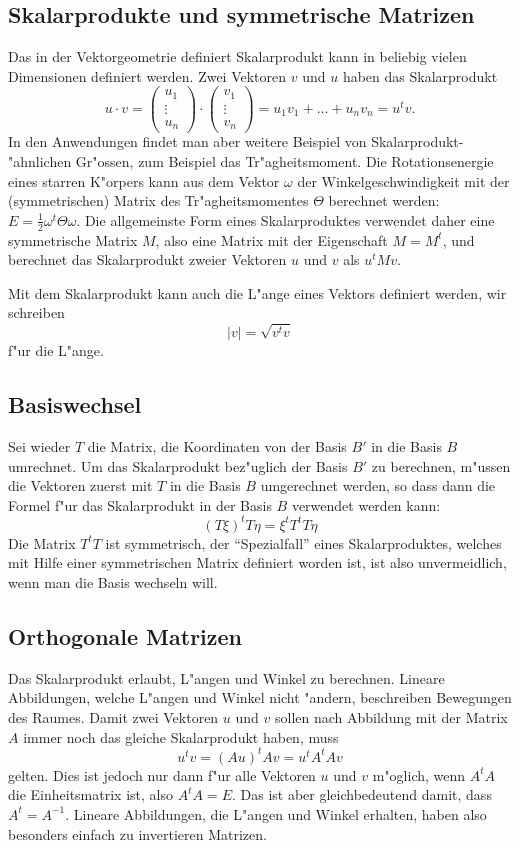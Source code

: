 \subsection{Skalarprodukte und symmetrische Matrizen}
Das in der Vektorgeometrie definiert Skalarprodukt kann in beliebig
vielen Dimensionen definiert werden. Zwei Vektoren $v$ und $u$ haben
das Skalarprodukt
\[
u\cdot v=
\begin{pmatrix}u_1\\\vdots\\u_n\end{pmatrix}
\cdot
\begin{pmatrix}v_1\\\vdots\\v_n\end{pmatrix}
=u_1v_1+\dots+u_nv_n=u^tv.
\]
In den Anwendungen findet man aber weitere Beispiel von
Skalarprodukt-"ahnlichen Gr"ossen, zum Beispiel das Tr"agheitsmoment.
Die Rotationsenergie eines starren K"orpers kann aus dem Vektor $\omega$
der Winkelgeschwindigkeit mit der (symmetrischen) Matrix des
Tr"agheitsmomentes $\Theta$
berechnet werden:
$
E=\frac12 \omega^t\Theta \omega.
$
Die allgemeinste Form eines Skalarproduktes verwendet daher eine
symmetrische Matrix $M$, also eine Matrix mit der Eigenschaft
$M=M^t$, und berechnet das Skalarprodukt zweier Vektoren $u$ und $v$
als $u^tMv$.

Mit dem Skalarprodukt kann auch die L"ange eines Vektors definiert 
werden, wir schreiben
\[
|v|=\sqrt{v^tv}
\]
f"ur die L"ange.

\subsection{Basiswechsel}
Sei wieder $T$ die Matrix, die Koordinaten von der Basis $B'$ in die
Basis $B$ umrechnet.
Um das Skalarprodukt bez"uglich der Basis $B'$ zu berechnen,
m"ussen die Vektoren zuerst mit $T$ in die Basis $B$ umgerechnet werden,
so dass dann die Formel f"ur das Skalarprodukt in der Basis $B$
verwendet werden kann:
\[
(T\xi)^tT\eta=\xi^tT^tT\eta
\]
Die Matrix $T^tT$ ist symmetrisch, der ``Spezialfall'' eines Skalarproduktes,
welches mit Hilfe einer symmetrischen Matrix definiert worden ist,
ist also unvermeidlich, wenn man die Basis wechseln will.

\subsection{Orthogonale Matrizen}
Das Skalarprodukt erlaubt, L"angen und Winkel zu berechnen. 
Lineare Abbildungen, welche L"angen und Winkel nicht "andern, beschreiben
Bewegungen des Raumes. Damit zwei Vektoren $u$ und $v$ sollen nach Abbildung
mit der Matrix $A$ immer noch das gleiche Skalarprodukt haben, muss
\[
u^tv=(Au)^tAv=u^tA^tAv
\]
gelten. Dies ist jedoch nur dann f"ur alle Vektoren $u$ und $v$ m"oglich,
wenn $A^tA$ die Einheitsmatrix ist, also $A^tA=E$. Das ist aber gleichbedeutend
damit, dass $A^t=A^{-1}$. Lineare Abbildungen, die L"angen und
Winkel erhalten, haben also besonders einfach zu invertieren Matrizen.

